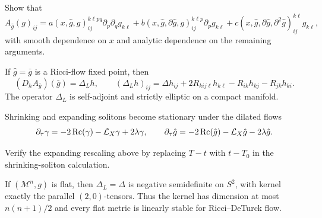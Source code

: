\begin{exercise}
\label{ex:chow-iv-local-ricci-deturck}
Show that
\begin{equation*}
 A_{\hat g}(g)_{ij}=a(x,\hat g,g)_{ij}^{k\ell pq}\partial_p\partial_qg_{k\ell}
 +b(x,\hat g,\partial\hat g,g)_{ij}^{k\ell p}\partial_pg_{k\ell}
 +c(x,\hat g,\partial\hat g,\partial^2\hat g)_{ij}^{k\ell}g_{k\ell},
 \tag{35.6}
\end{equation*}
with smooth dependence on $x$ and analytic dependence on the remaining
arguments.
\end{exercise}

\begin{proposition}
\label{prop:chow-iv-lichnerowicz-linearization}
If $\hat g=\bar g$ is a Ricci-flow fixed point, then
\[
 (D_hA_{\bar g})(\bar g)=\Delta_Lh,
 \qquad
 (\Delta_Lh)_{ij}=\Delta h_{ij}+2R_{kij\ell}h_{k\ell}-R_{ik}h_{kj}-R_{jk}h_{ki}.
 \tag{35.7}
\]
The operator $\Delta_L$ is self-adjoint and strictly elliptic on a compact
manifold.
\end{proposition}

Shrinking and expanding solitons become stationary under the dilated flows
\[
 \partial_\tau\gamma=-2\Rc(\gamma)-\mathcal L_X\gamma+2\lambda\gamma,
 \qquad
 \partial_\tau\hat g=-2\Rc(\hat g)-\mathcal L_X\hat g-2\lambda\hat g.
\]

\begin{exercise}
\label{ex:chow-iv-expanding-soliton-rescaling}
Verify the expanding rescaling above by replacing $T-t$ with $t-T_0$ in the
shrinking-soliton calculation.
\end{exercise}

\begin{proposition}
\label{prop:chow-iv-flat-linear-stability}
If $(\mathcal M^n,g)$ is flat, then $\Delta_L=\Delta$ is negative
semidefinite on $S^2$, with kernel exactly the parallel $(2,0)$-tensors.
Thus the kernel has dimension at most $n(n+1)/2$ and every flat metric is
linearly stable for Ricci--DeTurck flow.
\end{proposition}


